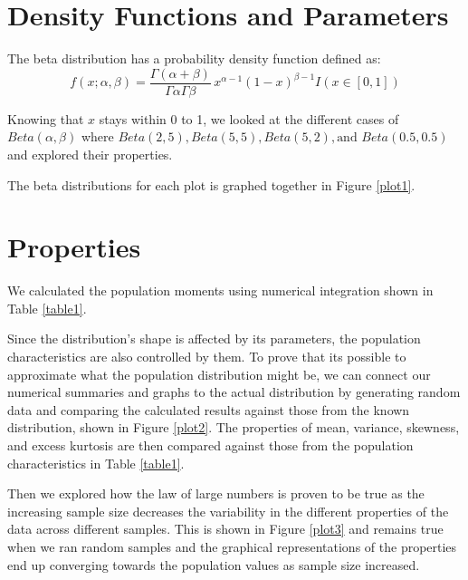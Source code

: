 \documentclass{article}\usepackage[]{graphicx}\usepackage[]{xcolor}
\newenvironment{Figure}
  {\par\medskip\noindent\minipage{\linewidth}}
  {\endminipage\par\medskip}
\begin{document}
\begin{multicols}{2}

\section{Density Functions and Parameters}
The beta distribution has a probability density function defined as: 
\[
f(x; \alpha, \beta) = \frac{\Gamma(\alpha + \beta)}{\Gamma\alpha\Gamma\beta} \, x^{\alpha - 1} (1 - x)^{\beta - 1}I(x \in [0,1])
\] 

Knowing that $x$ stays within 0 to 1, we looked at the different cases of \(Beta(\alpha, \beta)\) where \(Beta(2, 5), Beta(5,5), Beta(5, 2), \text{and }Beta(0.5, 0.5)\) and explored their properties. 

The beta distributions for each plot is graphed together in Figure \ref{plot1}.

\section{Properties}
We calculated the population moments using numerical integration shown in Table \ref{table1}.

Since the distribution's shape is affected by its parameters, the population characteristics are also controlled by them. To prove that its possible to approximate what the population distribution might be, we can connect our numerical summaries and graphs to the actual distribution by generating random data and comparing the calculated results against those from the known distribution, shown in Figure \ref{plot2}. The properties of mean, variance, skewness, and excess kurtosis are then compared against those from the population characteristics in Table \ref{table1}.

Then we explored how the law of large numbers is proven to be true as the increasing sample size decreases the variability in the different properties of the data across different samples. This is shown in Figure \ref{plot3} and remains true when we ran random samples and the graphical representations of the properties end up converging towards the population values as sample size increased. 




\end{multicols}
\end{document}
